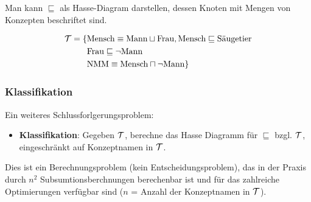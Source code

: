Man kann $\sqsubseteq$ als Hasse-Diagram darstellen, dessen Knoten mit Mengen von Konzepten beschriftet sind.

\begin{tafel}\mbox{}
    \begin{align*}
        \mathcal{T} = \{&\text{Mensch} \equiv \text{Mann} \sqcup \text{Frau}, \text{Mensch} \sqsubseteq \text{Säugetier}\\
               &\text{Frau} \sqsubseteq \neg\text{Mann}\\
               &\text{NMM} \equiv \text{Mensch} \sqcap \neg\text{Mann}\}
    \end{align*}
    \begin{center}
\end{center}
\end{tafel}

\subsubsection{Klassifikation}

Ein weiteres Schlussforlgerungsproblem:

\begin{itemize}
  \item \textbf{Klassifikation}: Gegeben $\mathcal{T}$, berechne das Hasse Diagramm für $\sqsubseteq$ bzgl. $\mathcal{T}$, eingeschränkt auf Konzeptnamen in $\mathcal{T}$.
\end{itemize}

Dies ist ein Berechnungsproblem (kein Entscheidungsproblem), das in der Praxis durch $n^2$ Subsumtionsberchnungen berechenbar ist und für das zahlreiche Optimierungen verfügbar sind ($n$ = Anzahl der Konzeptnamen in $\mathcal{T}$).


